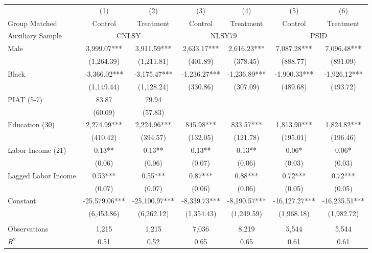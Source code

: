 \begin{tabular}{lcccccc} \toprule
 & (1) & (2) & (3) & (4) & (5) & (6) \\
Group Matched   & Control & Treatment & Control & Treatment  & Control & Treatment \\ 
Auxiliary Sample & \multicolumn{2}{c}{CNLSY} & \multicolumn{2}{c}{NLSY79}  & \multicolumn{2}{c}{PSID} \\  \midrule 
Male & 3,999.07*** & 3,911.59*** & 2,633.17*** & 2,616.23*** & 7,087.28*** & 7,096.48*** \\
 & (1,264.39) & (1,211.81) & (401.89) & (378.45) & (888.77) & (891.09) \\
Black & -3,366.02*** & -3,175.47*** & -1,236.27*** & -1,236.89*** & -1,900.33*** & -1,926.12*** \\
 & (1,149.44) & (1,128.24) & (330.86) & (307.09) & (489.68) & (493.72) \\
PIAT (5-7) & 83.87 & 79.94 &  &  &  &  \\
 & (60.09) & (57.83) &  &  &  &  \\
Education (30) & 2,274.99*** & 2,224.96*** & 845.98*** & 833.57*** & 1,813.90*** & 1,824.82*** \\
 & (410.42) & (394.57) & (132.05) & (121.78) & (195.01) & (196.46) \\
Labor Income (21) & 0.13** & 0.13** & 0.13** & 0.13** & 0.06* & 0.06* \\
 & (0.06) & (0.06) & (0.07) & (0.06) & (0.03) & (0.03) \\
Lagged Labor Income  & 0.53*** & 0.55*** & 0.87*** & 0.88*** & 0.72*** & 0.72*** \\
 & (0.07) & (0.07) & (0.06) & (0.06) & (0.05) & (0.05) \\
Constant & -25,579.06*** & -25,100.97*** & -8,339.73*** & -8,190.57*** & -16,127.27*** & -16,235.51*** \\
 & (6,453.86) & (6,262.12) & (1,354.43) & (1,249.59) & (1,968.18) & (1,982.72) \\ \\ \midrule
Observations & 1,215 & 1,215 & 7,036 & 8,219 & 5,544 & 5,544 \\
$R^2$  & 0.51 & 0.52 & 0.65 & 0.65 & 0.61 & 0.61 \\ \bottomrule
\end{tabular}
